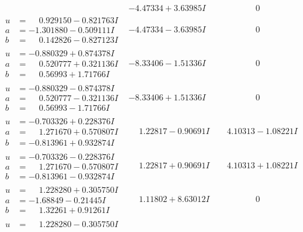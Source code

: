 \documentclass[1p]{elsarticle_modified}
\theoremstyle{definition}
\begin{document}
$$\begin{array}{c|c|c}
 & -4.47334 + 3.63985 I & \phantom{-0.000000 } 0 \\ \hline\begin{aligned}
u &= \phantom{-}0.929150 - 0.821763 I \\
a &= -1.301880 - 0.509111 I \\
b &= \phantom{-}0.142826 - 0.827123 I\end{aligned}
 & -4.47334 - 3.63985 I & \phantom{-0.000000 } 0 \\ \hline\begin{aligned}
u &= -0.880329 + 0.874378 I \\
a &= \phantom{-}0.520777 + 0.321136 I \\
b &= \phantom{-}0.56993 + 1.71766 I\end{aligned}
 & -8.33406 - 1.51336 I & \phantom{-0.000000 } 0 \\ \hline\begin{aligned}
u &= -0.880329 - 0.874378 I \\
a &= \phantom{-}0.520777 - 0.321136 I \\
b &= \phantom{-}0.56993 - 1.71766 I\end{aligned}
 & -8.33406 + 1.51336 I & \phantom{-0.000000 } 0 \\ \hline\begin{aligned}
u &= -0.703326 + 0.228376 I \\
a &= \phantom{-}1.271670 + 0.570807 I \\
b &= -0.813961 + 0.932874 I\end{aligned}
 & \phantom{-}1.22817 - 0.90691 I & \phantom{-}4.10313 - 1.08221 I \\ \hline\begin{aligned}
u &= -0.703326 - 0.228376 I \\
a &= \phantom{-}1.271670 - 0.570807 I \\
b &= -0.813961 - 0.932874 I\end{aligned}
 & \phantom{-}1.22817 + 0.90691 I & \phantom{-}4.10313 + 1.08221 I \\ \hline\begin{aligned}
u &= \phantom{-}1.228280 + 0.305750 I \\
a &= -1.68849 - 0.21445 I \\
b &= \phantom{-}1.32261 + 0.91261 I\end{aligned}
 & \phantom{-}1.11802 + 8.63012 I & \phantom{-0.000000 } 0 \\ \hline\begin{aligned}
u &= \phantom{-}1.228280 - 0.305750 I \\

\end{aligned}
\end{array}$$
\end{document}
